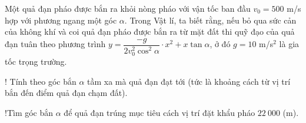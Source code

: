 \begin{vd}%
	Một quả đạn pháo được bắn ra khỏi nòng pháo với vận tốc ban đầu $ v_0=500$ m/s hợp với phương ngang một góc $ \alpha $. Trong Vật lí, ta biết rằng, nếu bỏ qua sức cản của không khí và coi quả đạn pháo được bắn ra từ mặt đất thi quỹ đạo của quả đạn tuân theo phương trình $ y=\dfrac{-g}{2v_0^2\cos^2\alpha}\cdot x^2+x\tan \alpha $, ở đó $g = 10$ m/s$ ^2 $ là gia tốc trọng trường.
	\begin{listEX}[2]
		\item! Tính theo góc bắn $\alpha$ tầm xa mà quả đạn đạt tới (tức là khoảng cách từ vị trí bắn đến điểm quả đạn chạm đất).
		\item!Tìm góc bắn $ \alpha $ để quả đạn trúng mục tiêu cách vị trí đặt khẩu pháo $22~000$ (m).
	\end{listEX}
\end{vd}

